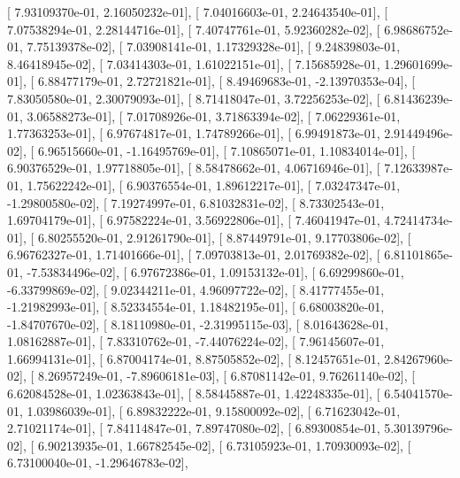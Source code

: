 \documentclass{article}
\begin{document}
       [  7.93109370e-01,   2.16050232e-01],
       [  7.04016603e-01,   2.24643540e-01],
       [  7.07538294e-01,   2.28144716e-01],
       [  7.40747761e-01,   5.92360282e-02],
       [  6.98686752e-01,   7.75139378e-02],
       [  7.03908141e-01,   1.17329328e-01],
       [  9.24839803e-01,   8.46418945e-02],
       [  7.03414303e-01,   1.61022151e-01],
       [  7.15685928e-01,   1.29601699e-01],
       [  6.88477179e-01,   2.72721821e-01],
       [  8.49469683e-01,  -2.13970353e-04],
       [  7.83050580e-01,   2.30079093e-01],
       [  8.71418047e-01,   3.72256253e-02],
       [  6.81436239e-01,   3.06588273e-01],
       [  7.01708926e-01,   3.71863394e-02],
       [  7.06229361e-01,   1.77363253e-01],
       [  6.97674817e-01,   1.74789266e-01],
       [  6.99491873e-01,   2.91449496e-02],
       [  6.96515660e-01,  -1.16495769e-01],
       [  7.10865071e-01,   1.10834014e-01],
       [  6.90376529e-01,   1.97718805e-01],
       [  8.58478662e-01,   4.06716946e-01],
       [  7.12633987e-01,   1.75622242e-01],
       [  6.90376554e-01,   1.89612217e-01],
       [  7.03247347e-01,  -1.29800580e-02],
       [  7.19274997e-01,   6.81032831e-02],
       [  8.73302543e-01,   1.69704179e-01],
       [  6.97582224e-01,   3.56922806e-01],
       [  7.46041947e-01,   4.72414734e-01],
       [  6.80255520e-01,   2.91261790e-01],
       [  8.87449791e-01,   9.17703806e-02],
       [  6.96762327e-01,   1.71401666e-01],
       [  7.09703813e-01,   2.01769382e-02],
       [  6.81101865e-01,  -7.53834496e-02],
       [  6.97672386e-01,   1.09153132e-01],
       [  6.69299860e-01,  -6.33799869e-02],
       [  9.02344211e-01,   4.96097722e-02],
       [  8.41777455e-01,  -1.21982993e-01],
       [  8.52334554e-01,   1.18482195e-01],
       [  6.68003820e-01,  -1.84707670e-02],
       [  8.18110980e-01,  -2.31995115e-03],
       [  8.01643628e-01,   1.08162887e-01],
       [  7.83310762e-01,  -7.44076224e-02],
       [  7.96145607e-01,   1.66994131e-01],
       [  6.87004174e-01,   8.87505852e-02],
       [  8.12457651e-01,   2.84267960e-02],
       [  8.26957249e-01,  -7.89606181e-03],
       [  6.87081142e-01,   9.76261140e-02],
       [  6.62084528e-01,   1.02363843e-01],
       [  8.58445887e-01,   1.42248335e-01],
       [  6.54041570e-01,   1.03986039e-01],
       [  6.89832222e-01,   9.15800092e-02],
       [  6.71623042e-01,   2.71021174e-01],
       [  7.84114847e-01,   7.89747080e-02],
       [  6.89300854e-01,   5.30139796e-02],
       [  6.90213935e-01,   1.66782545e-02],
       [  6.73105923e-01,   1.70930093e-02],
       [  6.73100040e-01,  -1.29646783e-02],
\end{document}
